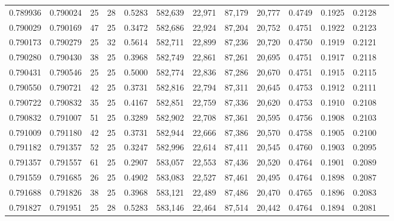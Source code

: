 \begin{tabular}{rrrrrrrrrrrrr}
0.789936 & 0.790024 &    25 &  28 &                                     0.5283 & 582,639 &  22,971 &  87,179 &  20,777 & 0.4749 & 0.1925 & 0.2128 \\
0.790029 & 0.790169 &    47 &  25 &                                     0.3472 & 582,686 &  22,924 &  87,204 &  20,752 & 0.4751 & 0.1922 & 0.2123 \\
0.790173 & 0.790279 &    25 &  32 &                                     0.5614 & 582,711 &  22,899 &  87,236 &  20,720 & 0.4750 & 0.1919 & 0.2121 \\
0.790280 & 0.790430 &    38 &  25 &                                     0.3968 & 582,749 &  22,861 &  87,261 &  20,695 & 0.4751 & 0.1917 & 0.2118 \\
0.790431 & 0.790546 &    25 &  25 &                                     0.5000 & 582,774 &  22,836 &  87,286 &  20,670 & 0.4751 & 0.1915 & 0.2115 \\
0.790550 & 0.790721 &    42 &  25 &                                     0.3731 & 582,816 &  22,794 &  87,311 &  20,645 & 0.4753 & 0.1912 & 0.2111 \\
0.790722 & 0.790832 &    35 &  25 &                                     0.4167 & 582,851 &  22,759 &  87,336 &  20,620 & 0.4753 & 0.1910 & 0.2108 \\
0.790832 & 0.791007 &    51 &  25 &                                     0.3289 & 582,902 &  22,708 &  87,361 &  20,595 & 0.4756 & 0.1908 & 0.2103 \\
0.791009 & 0.791180 &    42 &  25 &                                     0.3731 & 582,944 &  22,666 &  87,386 &  20,570 & 0.4758 & 0.1905 & 0.2100 \\
0.791182 & 0.791357 &    52 &  25 &                                     0.3247 & 582,996 &  22,614 &  87,411 &  20,545 & 0.4760 & 0.1903 & 0.2095 \\
0.791357 & 0.791557 &    61 &  25 &                                     0.2907 & 583,057 &  22,553 &  87,436 &  20,520 & 0.4764 & 0.1901 & 0.2089 \\
0.791559 & 0.791685 &    26 &  25 &                                     0.4902 & 583,083 &  22,527 &  87,461 &  20,495 & 0.4764 & 0.1898 & 0.2087 \\
0.791688 & 0.791826 &    38 &  25 &                                     0.3968 & 583,121 &  22,489 &  87,486 &  20,470 & 0.4765 & 0.1896 & 0.2083 \\
0.791827 & 0.791951 &    25 &  28 &                                     0.5283 & 583,146 &  22,464 &  87,514 &  20,442 & 0.4764 & 0.1894 & 0.2081 \\

\end{tabular}
